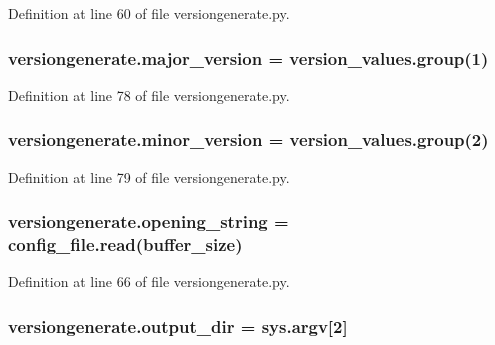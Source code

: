 Definition at line 60 of file versiongenerate.\+py.

\subsubsection[{\texorpdfstring{major\+\_\+version}{major_version}}]{\setlength{\rightskip}{0pt plus 5cm}versiongenerate.\+major\+\_\+version = version\+\_\+values.\+group(1)}\hypertarget{namespaceversiongenerate_a4b536109523f1bc805806f8d76ca34ac}{}\label{namespaceversiongenerate_a4b536109523f1bc805806f8d76ca34ac}


Definition at line 78 of file versiongenerate.\+py.

\subsubsection[{\texorpdfstring{minor\+\_\+version}{minor_version}}]{\setlength{\rightskip}{0pt plus 5cm}versiongenerate.\+minor\+\_\+version = version\+\_\+values.\+group(2)}\hypertarget{namespaceversiongenerate_af8027cbccfcda6a243f0544cc3c08b28}{}\label{namespaceversiongenerate_af8027cbccfcda6a243f0544cc3c08b28}


Definition at line 79 of file versiongenerate.\+py.

\subsubsection[{\texorpdfstring{opening\+\_\+string}{opening_string}}]{\setlength{\rightskip}{0pt plus 5cm}versiongenerate.\+opening\+\_\+string = config\+\_\+file.\+read({\bf buffer\+\_\+size})}\hypertarget{namespaceversiongenerate_a88cc36d80d757546e04817490ebb0640}{}\label{namespaceversiongenerate_a88cc36d80d757546e04817490ebb0640}


Definition at line 66 of file versiongenerate.\+py.

\subsubsection[{\texorpdfstring{output\+\_\+dir}{output_dir}}]{\setlength{\rightskip}{0pt plus 5cm}versiongenerate.\+output\+\_\+dir = sys.\+argv\mbox{[}2\mbox{]}}\hypertarget{namespaceversiongenerate_aab714e0aa9036025ba7c83eb7422c567}{}\label{namespaceversiongenerate_aab714e0aa9036025ba7c83eb7422c567}


